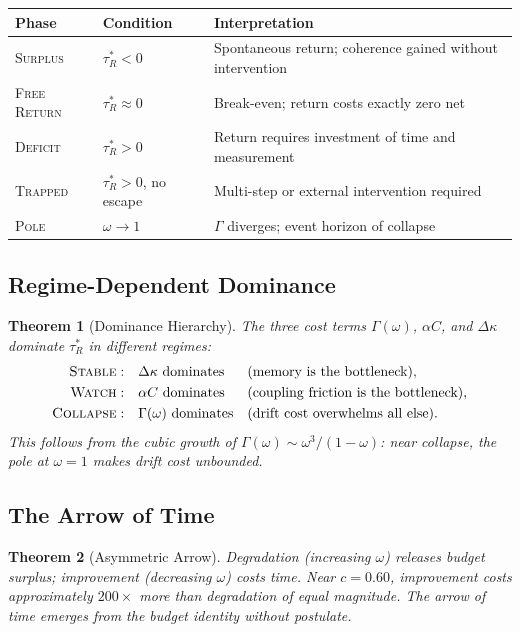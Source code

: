\documentclass[
  aps,
  prd,
  preprint,
  superscriptaddress,
  nofootinbib,
  floatfix,
  longbibliography
]{revtex4-2}
\newtheorem{theorem}{Theorem}
\newcommand{\tRstar}{\tau_{\!R}^{*}}
\newcommand{\Gam}{\Gamma}
\newcommand{\regime}[1]{\textnormal{\textsc{#1}}}
\newcommand{\Drft}{\omega}
\newcommand{\Curv}{C}
\newcommand{\Logint}{\kappa}
\begin{document}
\begin{center}
\begin{tabular}{@{}llp{6.5cm}@{}}
\toprule
\textbf{Phase} & \textbf{Condition} & \textbf{Interpretation} \\
\midrule
\regime{Surplus}     & $\tRstar < 0$ &
  Spontaneous return; coherence gained without intervention \\
\regime{Free Return} & $\tRstar \approx 0$ &
  Break-even; return costs exactly zero net \\
\regime{Deficit}     & $\tRstar > 0$ &
  Return requires investment of time and measurement \\
\regime{Trapped}     & $\tRstar > 0$, no escape &
  Multi-step or external intervention required \\
\regime{Pole}        & $\Drft \to 1$ &
  $\Gam$ diverges; event horizon of collapse \\
\bottomrule
\end{tabular}
\end{center}

\subsection{Regime-Dependent Dominance}

\begin{theorem}[Dominance Hierarchy]\label{thm:dominance}
The three cost terms $\Gam(\Drft)$, $\alpha\Curv$, and
$\Delta\Logint$ dominate $\tRstar$ in different regimes:
\begin{align}
  \regime{Stable}: &\quad \Delta\Logint \text{ dominates}
    &&\text{(memory is the bottleneck)}, \nonumber\\
  \regime{Watch}: &\quad \alpha\Curv \text{ dominates}
    &&\text{(coupling friction is the bottleneck)}, \nonumber\\
  \regime{Collapse}: &\quad \Gam(\Drft) \text{ dominates}
    &&\text{(drift cost overwhelms all else)}.
\end{align}
This follows from the cubic growth of $\Gam(\Drft)
\sim \Drft^3/(1-\Drft)$: near collapse, the pole at
$\Drft = 1$ makes drift cost unbounded.
\end{theorem}

\subsection{The Arrow of Time}

\begin{theorem}[Asymmetric Arrow]\label{thm:arrow}
Degradation (increasing $\Drft$) releases budget surplus;
improvement (decreasing $\Drft$) costs time.
Near $c = 0.60$, improvement costs approximately
$200\times$ more than degradation of equal magnitude.
The arrow of time emerges from the budget identity
without postulate.
\end{theorem}
\end{document}
